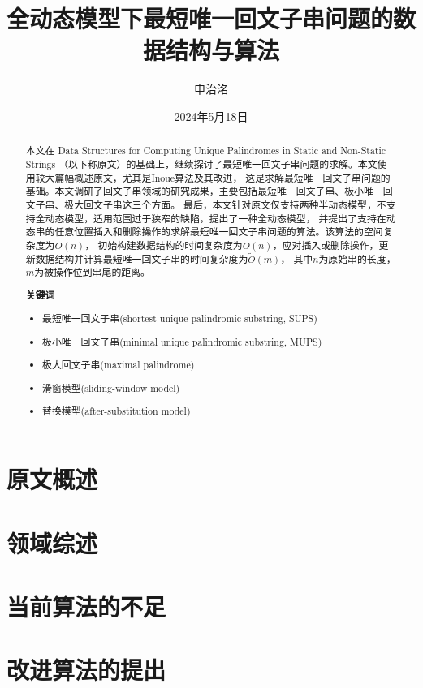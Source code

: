 \documentclass{ctexart}
\title{全动态模型下最短唯一回文子串问题的数据结构与算法}
\author{申治洺}
\date{2024年5月18日}
\begin{document}
    \maketitle

    \begin{abstract}
        本文在 Data Structures for Computing Unique Palindromes in Static and Non-Static Strings\cite{Mieno2024}
        （以下称原文）的基础上，继续探讨了最短唯一回文子串问题的求解。本文使用较大篇幅概述原文，尤其是Inoue算法\cite{Inoue2018}及其改进，
        这是求解最短唯一回文子串问题的基础。本文调研了回文子串领域的研究成果，主要包括最短唯一回文子串、极小唯一回文子串、极大回文子串这三个方面。
        最后，本文针对原文仅支持两种半动态模型，不支持全动态模型，适用范围过于狭窄的缺陷，提出了一种全动态模型，
        并提出了支持在动态串的任意位置插入和删除操作的求解最短唯一回文子串问题的算法。该算法的空间复杂度为$O(n)$，
        初始构建数据结构的时间复杂度为$O(n)$，应对插入或删除操作，更新数据结构并计算最短唯一回文子串的时间复杂度为$\tilde{O}(m)$，
        其中$n$为原始串的长度，$m$为被操作位到串尾的距离。

        \textbf{关键词}
        \begin{itemize}
            \item 最短唯一回文子串(shortest unique palindromic substring, SUPS)
            \item 极小唯一回文子串(minimal unique palindromic substring, MUPS)
            \item 极大回文子串(maximal palindrome)
            \item 滑窗模型(sliding-window model)
            \item 替换模型(after-substitution model)
        \end{itemize}
    \end{abstract}
    
    \section{原文概述}\label{sec:1}
    

    \section{领域综述}\label{sec:2}
    

    \section{当前算法的不足}\label{sec:3}
    

    \section{改进算法的提出}\label{sec:4}
    

    
    
\end{document}
